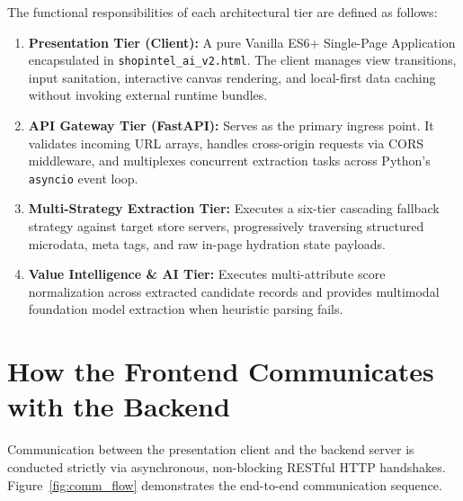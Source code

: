 \documentclass[12pt,a4paper,oneside]{report}
\begin{document}
The functional responsibilities of each architectural tier are defined as follows:
\begin{enumerate}
    \item \textbf{Presentation Tier (Client):} A pure Vanilla ES6+ Single-Page Application encapsulated in \texttt{shopintel\_ai\_v2.html}. The client manages view transitions, input sanitation, interactive canvas rendering, and local-first data caching without invoking external runtime bundles.
    \item \textbf{API Gateway Tier (FastAPI):} Serves as the primary ingress point. It validates incoming URL arrays, handles cross-origin requests via CORS middleware, and multiplexes concurrent extraction tasks across Python's \texttt{asyncio} event loop.
    \item \textbf{Multi-Strategy Extraction Tier:} Executes a six-tier cascading fallback strategy against target store servers, progressively traversing structured microdata, meta tags, and raw in-page hydration state payloads.
    \item \textbf{Value Intelligence \& AI Tier:} Executes multi-attribute score normalization across extracted candidate records and provides multimodal foundation model extraction when heuristic parsing fails.
\end{enumerate}

\section{How the Frontend Communicates with the Backend}
Communication between the presentation client and the backend server is conducted strictly via asynchronous, non-blocking RESTful HTTP handshakes. Figure~\ref{fig:comm_flow} demonstrates the end-to-end communication sequence.
\end{document}
